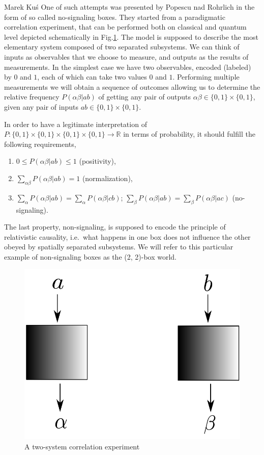 \begin{artengenv}{Marek Ku\'s}
One of such attempts was presented by Popescu nad Rohrlich \parencite*{popescu_quantum_1994} in the form of so called no-signaling boxes. They started from a paradigmatic correlation experiment, that can be performed both on classical and quantum level depicted schematically in Fig.\ref{fig:bellex1}. The model is supposed to describe the most elementary system composed of two separated subsystems. We can think of inputs as observables that we choose to measure, and outputs as the results of measurements. In the simplest case we have two observables, encoded (labeled) by $0$ and $1$, each of which can take two values $0$ and $1$. Performing multiple measurements we will obtain a sequence of outcomes allowing us to determine the relative frequency $P(\alpha\beta| ab)$ of getting any pair of outputs $\alpha\beta\in  \{0, 1\}\times \{0, 1\}$, given any pair of inputs $a b \in  \{0, 1\}\times \{0, 1\}$.

In order to have a legitimate interpretation of $P: \{0, 1\}\times \{0, 1\}\times \{0, 1\}\times \{0, 1\}\rightarrow \mathbb{R}$ in terms of probability, it should fulfill the following requirements,
\begin{enumerate}
	\item $ 0\le P(\alpha\beta| ab)\le 1 $ (positivity),
	\item $ \sum_{\alpha\beta}P(\alpha\beta| ab)=1 $ (normalization),
	\item $ \sum_\alpha P(\alpha\beta| ab)=\sum_\alpha P(\alpha\beta| cb)  $; $ \sum_\beta  P(\alpha\beta| ab)=\sum_\beta  P(\alpha\beta| ac)  $ (no-signaling).
\end{enumerate}
The last property, non-signaling, is supposed to encode the principle of relativistic causality, i.e.\ what happens in one box does not influence the other obeyed by spatially separated subsystems. We will refer to this particular example of non-signaling boxes as the (2, 2)-box world.

\begin{figure}
	\centering
	\includegraphics[width=0.7\linewidth]{ART_Kus/BellEx1}
	\caption{A two-system correlation experiment}
	\label{fig:bellex1}
\end{figure}



\end{artengenv}
